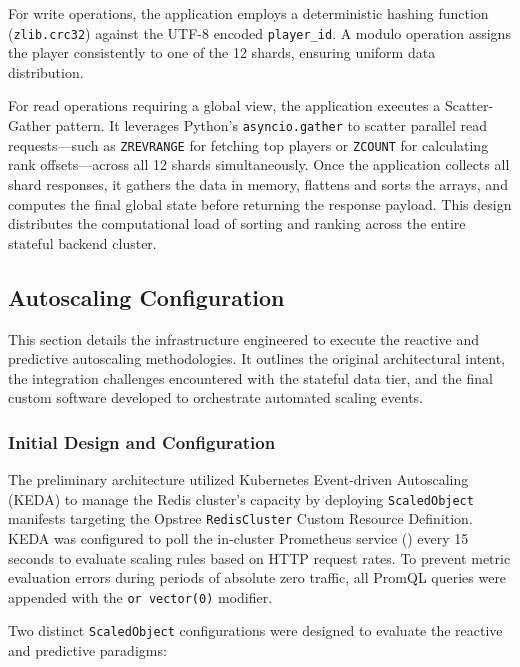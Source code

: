     For write operations, the application employs a deterministic hashing function (\texttt{zlib.crc32}) against the UTF-8 encoded \texttt{player\_id}. A modulo operation assigns the player consistently to one of the 12 shards, ensuring uniform data distribution.

    For read operations requiring a global view, the application executes a Scatter-Gather pattern. It leverages Python's \texttt{asyncio.gather} to scatter parallel read requests---such as \texttt{ZREVRANGE} for fetching top players or \texttt{ZCOUNT} for calculating rank offsets---across all 12 shards simultaneously. Once the application collects all shard responses, it gathers the data in memory, flattens and sorts the arrays, and computes the final global state before returning the response payload. This design distributes the computational load of sorting and ranking across the entire stateful backend cluster.

\subsection{Autoscaling Configuration}
\label{subsec:autoscaling-configuration}

    This section details the infrastructure engineered to execute the reactive and predictive autoscaling methodologies. It outlines the original architectural intent, the integration challenges encountered with the stateful data tier, and the final custom software developed to orchestrate automated scaling events.

\subsubsection{Initial Design and Configuration}
\label{subsubsec:initial-design-and-configuration}

    The preliminary architecture utilized Kubernetes Event-driven Autoscaling (KEDA) to manage the Redis cluster's capacity by deploying \texttt{ScaledObject} manifests targeting the Opstree \texttt{RedisCluster} Custom Resource Definition. KEDA was configured to poll the in-cluster Prometheus service () every 15 seconds to evaluate scaling rules based on HTTP request rates. To prevent metric evaluation errors during periods of absolute zero traffic, all PromQL queries were appended with the \texttt{or vector(0)} modifier.

    Two distinct \texttt{ScaledObject} configurations were designed to evaluate the reactive and predictive paradigms:

